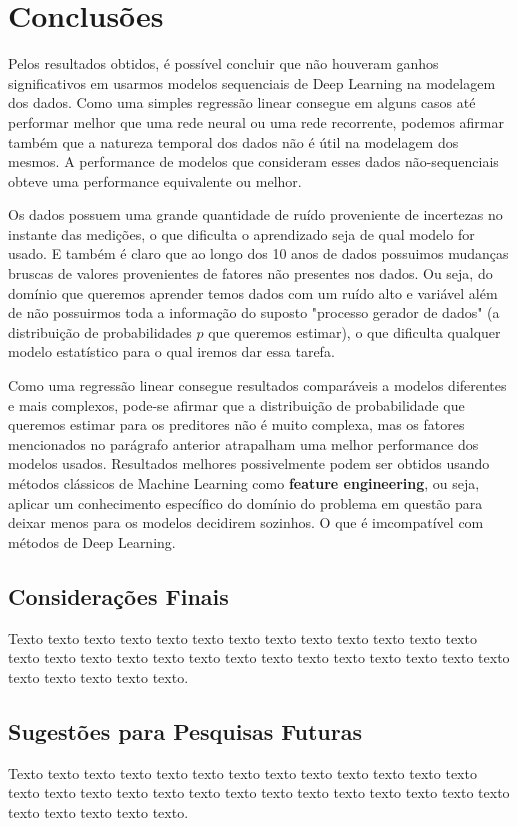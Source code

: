 \chapter{Conclusões}
\label{cap:conclusoes}


Pelos resultados obtidos, é possível concluir que não houveram ganhos significativos em usarmos modelos sequenciais de Deep Learning na modelagem dos dados. Como uma simples regressão linear consegue em alguns casos até performar melhor que uma rede neural ou uma rede recorrente, podemos afirmar também que a natureza temporal dos dados não é útil na modelagem dos mesmos. A performance de modelos que consideram esses dados não-sequenciais obteve uma performance equivalente ou melhor.

Os dados possuem uma grande quantidade de ruído proveniente de incertezas no instante das medições, o que dificulta o aprendizado seja de qual modelo for usado. E também é claro que ao longo dos 10 anos de dados possuimos mudanças bruscas de valores provenientes de fatores não presentes nos dados. Ou seja, do domínio que queremos aprender temos dados com um ruído alto e variável além de não possuirmos toda a informação do suposto "processo gerador de dados" (a distribuição de probabilidades $p$ que queremos estimar), o que dificulta qualquer modelo estatístico para o qual iremos dar essa tarefa.

Como uma regressão linear consegue resultados comparáveis a modelos diferentes e mais complexos, pode-se afirmar que a distribuição de probabilidade que queremos estimar para os preditores não é muito complexa, mas os fatores mencionados no parágrafo anterior atrapalham uma melhor performance dos modelos usados. Resultados melhores possivelmente podem ser obtidos usando métodos clássicos de Machine Learning como \textbf{feature engineering}, ou seja, aplicar um conhecimento específico do domínio do problema em questão para deixar menos para os modelos decidirem sozinhos. O que é imcompatível com métodos de Deep Learning. 




\section{Considerações Finais} 

Texto texto texto texto texto texto texto texto texto texto texto texto texto
texto texto texto texto texto texto texto texto texto texto texto texto texto
texto texto texto texto texto texto. 

\section{Sugestões para Pesquisas Futuras} 

Texto texto texto texto texto texto texto texto texto texto texto texto texto
texto texto texto texto texto texto texto texto texto texto texto texto texto
texto texto texto texto texto texto.

